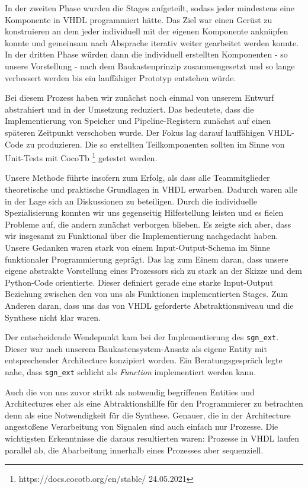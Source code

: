 \documentclass[paper=a4,fontsize=11pt,twocolumn]{scrreprt}
\begin{document}
In der zweiten Phase wurden die Stages aufgeteilt, sodass jeder mindestens eine Komponente in VHDL programmiert hätte.
Das Ziel war einen Gerüst zu konstruieren an dem jeder individuell mit der eigenen Komponente anknüpfen konnte und gemeinsam nach Absprache iterativ weiter gearbeitet werden konnte.
In der dritten Phase würden dann die individuell erstellten Komponenten - so unsere Vorstellung - nach dem Baukastenprinzip zusammengesetzt und so lange verbessert werden bis ein lauffähiger Prototyp entstehen würde.

Bei diesem Prozess haben wir zunächst noch einmal von unserem Entwurf abstrahiert und in der Umsetzung reduziert.
Das bedeutete, dass die Implementierung von Speicher und Pipeline-Registern zunächst auf einen späteren Zeitpunkt verschoben wurde.
Der Fokus lag darauf lauffähigen VHDL-Code zu produzieren.
Die so erstellten Teilkomponenten sollten im Sinne von Unit-Tests mit CocoTb \footnote{https://docs.cocotb.org/en/stable/ 24.05.2021} getestet werden.

Unsere Methode führte insofern zum Erfolg, als dass alle Teammitglieder theoretische und praktische Grundlagen in VHDL erwarben.
Dadurch waren alle in der Lage sich an Diskussionen zu beteiligen.
Durch die individuelle Spezialisierung konnten wir uns gegenseitig Hilfestellung leisten und es fielen Probleme auf, die andern zunächst verborgen blieben.
Es zeigte sich aber, dass wir insgesamt zu Funktional über die Implementierung nachgedacht haben. Unsere Gedanken waren stark von einem Input-Output-Schema im Sinne funktionaler Programmierung geprägt.
Das lag zum Einem daran, dass unsere eigene abstrakte Vorstellung eines Prozessors sich zu stark an der Skizze und dem Python-Code orientierte. Dieser definiert gerade eine starke Input-Output Beziehung zwischen den von uns als Funktionen implementierten Stages.
Zum Anderen daran, dass uns das von VHDL geforderte Abstraktionsniveau und die Synthese nicht klar waren.

Der entscheidende Wendepunkt kam bei der Implementierung des \texttt{sgn\_ext}.
Dieser war nach unserem Baukastensystem-Ansatz als eigene Entity mit entsprechender Architecture konzipiert worden.
Ein Beratungsgespräch legte nahe, dass \texttt{sgn\_ext} schlicht als \textit{Function} implementiert werden kann.

Auch die von uns zuvor strikt als notwendig begriffenen Entities und Architectures eher als eine Abtraktionshillfe für den Programmierer zu betrachten denn als eine Notwendigkeit für die Synthese.
Genauer, die in der Architecture angestoßene Verarbeitung von Signalen sind auch einfach nur Prozesse.
Die wichtigsten Erkenntnisse die daraus resultierten waren: Prozesse in VHDL laufen parallel ab, die Abarbeitung innerhalb eines Prozesses aber sequenziell.
\end{document}

